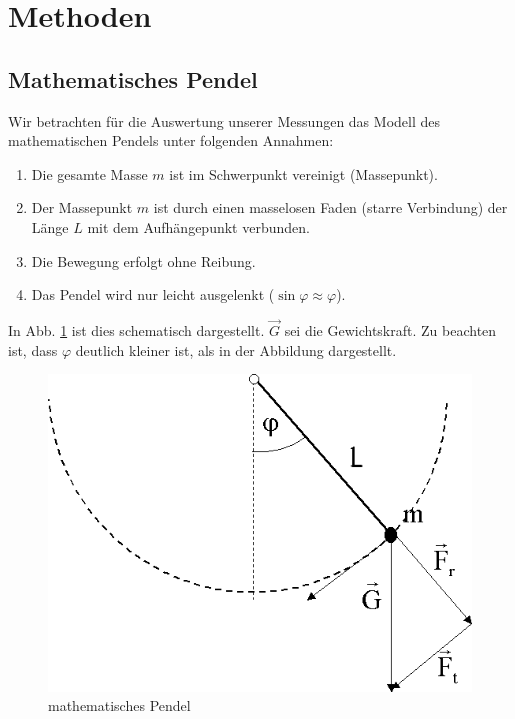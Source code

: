 \documentclass[11pt,a4paper,titlepage, ngerman]{article}
\begin{document}
	\section{Methoden}
		
		\subsection{Mathematisches Pendel}
		\label{pendel}
		
		Wir betrachten für die Auswertung unserer Messungen das Modell des mathematischen Pendels unter folgenden Annahmen:
		\begin{enumerate}
			\item Die gesamte Masse $m$ ist im Schwerpunkt vereinigt (Massepunkt).
			\item Der Massepunkt $m$ ist durch einen masselosen Faden (starre Verbindung) der Länge $L$ mit dem Aufhängepunkt verbunden.
			\item Die Bewegung erfolgt ohne Reibung.
			\item Das Pendel wird nur leicht ausgelenkt ($\sin \varphi \approx \varphi$).
		\end{enumerate}
		In Abb. \ref{fig:matpendel} ist dies schematisch dargestellt. $\vec{G}$ sei die Gewichtskraft.
		Zu beachten ist, dass $\varphi$ deutlich kleiner ist, als in der Abbildung dargestellt.
		
		\begin{figure}[ht]
			\centering
			\includegraphics[scale=0.4]{mathematischesPendel.png}		
			\caption{mathematisches Pendel}
			\label{fig:matpendel}
		\end{figure}
		
\end{document}
